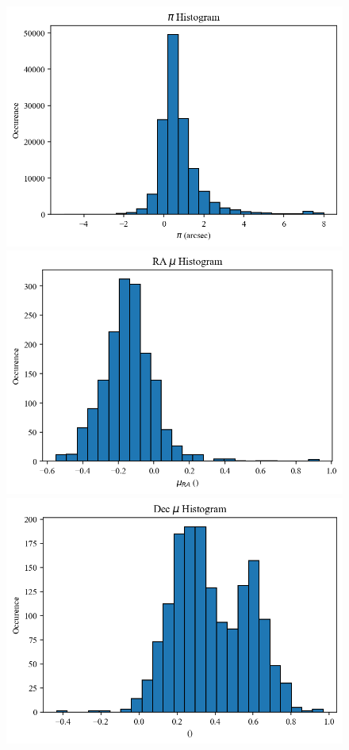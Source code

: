 \documentclass{article}
\begin{document}
\begin{figure}[H]
    \centering
    \includegraphics[scale = .5]{Figure 2025-02-08 230950 (1).png}
    \includegraphics[scale = .5]{Figure 2025-02-08 230950 (2).png}
    \includegraphics[scale = .5]{Figure 2025-02-08 230950 (3).png}

\end{figure}
\end{document}
